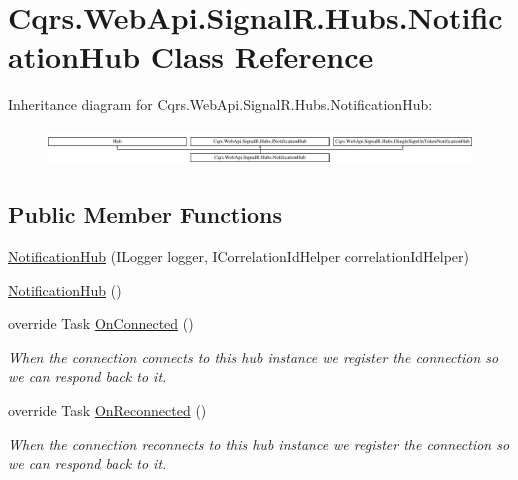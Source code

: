 \hypertarget{classCqrs_1_1WebApi_1_1SignalR_1_1Hubs_1_1NotificationHub}{}\section{Cqrs.\+Web\+Api.\+Signal\+R.\+Hubs.\+Notification\+Hub Class Reference}
\label{classCqrs_1_1WebApi_1_1SignalR_1_1Hubs_1_1NotificationHub}
Inheritance diagram for Cqrs.\+Web\+Api.\+Signal\+R.\+Hubs.\+Notification\+Hub\+:\begin{figure}[H]
\begin{center}
\leavevmode
\includegraphics[height=0.987654cm]{classCqrs_1_1WebApi_1_1SignalR_1_1Hubs_1_1NotificationHub}
\end{center}
\end{figure}
\subsection*{Public Member Functions}
\begin{DoxyCompactItemize}
\item 
\hyperlink{classCqrs_1_1WebApi_1_1SignalR_1_1Hubs_1_1NotificationHub_aeb3d9f4d90baeb103231c5c47a13e00d_aeb3d9f4d90baeb103231c5c47a13e00d}{Notification\+Hub} (I\+Logger logger, I\+Correlation\+Id\+Helper correlation\+Id\+Helper)
\item 
\hyperlink{classCqrs_1_1WebApi_1_1SignalR_1_1Hubs_1_1NotificationHub_a83b123b045c22ce5bcaee79168cca10a_a83b123b045c22ce5bcaee79168cca10a}{Notification\+Hub} ()
\item 
override Task \hyperlink{classCqrs_1_1WebApi_1_1SignalR_1_1Hubs_1_1NotificationHub_a0188fd4fea68476ffc3b375482c7b56c_a0188fd4fea68476ffc3b375482c7b56c}{On\+Connected} ()
\begin{DoxyCompactList}\small\item\em When the connection connects to this hub instance we register the connection so we can respond back to it. \end{DoxyCompactList}\item 
override Task \hyperlink{classCqrs_1_1WebApi_1_1SignalR_1_1Hubs_1_1NotificationHub_acaadcc7cc9f00c184e12b6bb725a2167_acaadcc7cc9f00c184e12b6bb725a2167}{On\+Reconnected} ()
\begin{DoxyCompactList}\small\item\em When the connection reconnects to this hub instance we register the connection so we can respond back to it. \end{DoxyCompactList}\end{DoxyCompactItemize}
